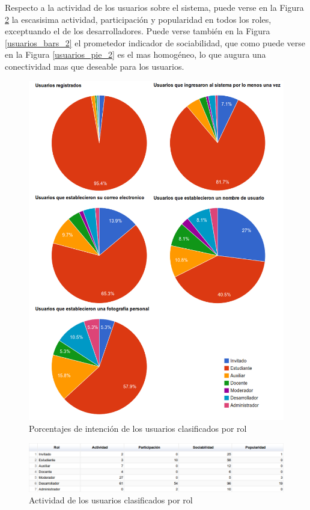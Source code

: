 Respecto a la actividad de los usuarios sobre el sistema, puede verse en la Figura \ref{usuarios_tabla_2} la escasisima 
actividad, participaci\'on y popularidad en todos los roles, exceptuando el de los desarrolladores. Puede verse tambi\'en en
la Figura \ref{usuarios_bars_2} el prometedor indicador de sociabilidad, que como puede verse en la Figura 
\ref{usuarios_pie_2} es el mas homog\'eneo, lo que augura una conectividad mas que deseable para los usuarios.

\begin{figure}[H]
\centering
 \includegraphics[scale=0.4]{graphics/usuarios_pie_1.png}
 \caption {Porcentajes de intenci\'on de los usuarios clasificados por rol}
 \label{usuarios_pie_1}
\end{figure}

\begin{figure}[H]
\centering
 \includegraphics[scale=0.4]{graphics/usuarios_tabla_2.png}
 \caption {Actividad de los usuarios clasificados por rol}
 \label {usuarios_tabla_2}
\end{figure}

